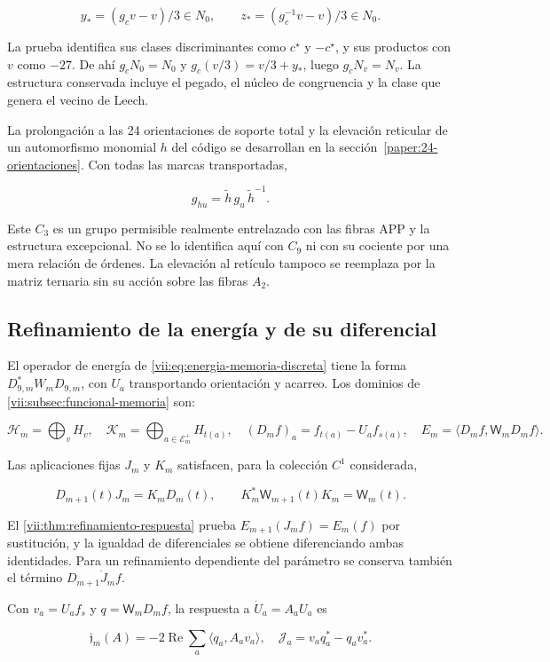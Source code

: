 \[
y_*=(g_cv-v)/3\in N_0,\qquad
z_*=(g_c^{-1}v-v)/3\in N_0.
\]

La prueba identifica sus clases discriminantes como \(c^\star\) y \(-c^\star\), y sus productos con \(v\) como \(-27\). De ahí \(g_cN_0=N_0\) y \(g_c(v/3)=v/3+y_*\), luego \(g_cN_v=N_v\). La estructura conservada incluye el pegado, el núcleo de congruencia y la clase que genera el vecino de Leech.

La prolongación a las 24 orientaciones de soporte total y la elevación reticular de un automorfismo monomial \(h\) del código se desarrollan en la sección~\ref{paper:24-orientaciones}. Con todas las marcas transportadas,

\[
g_{hu}=\widetilde h\,g_u\,\widetilde h^{-1}.
\]

Este \(C_3\) es un grupo permisible realmente entrelazado con las fibras APP y la estructura excepcional. No se lo identifica aquí con \(C_9\) ni con su cociente por una mera relación de órdenes. La elevación al retículo tampoco se reemplaza por la matriz ternaria sin su acción sobre las fibras \(A_2\).

\subsection{Refinamiento de la energía y de su diferencial}
\label{paper:refinamiento-energia}

El operador de energía de \eqref{vii:eq:energia-memoria-discreta} tiene la forma \(D_{9,m}^*W_mD_{9,m}\), con \(U_a\) transportando orientación y acarreo. Los dominios de \cref{vii:subsec:funcional-memoria} son:

\[
\mathcal H_m=\bigoplus_vH_v,\quad
\mathcal K_m=\bigoplus_{a\in\mathcal E_m^+}H_{t(a)},\quad
(D_mf)_a=f_{t(a)}-U_af_{s(a)},\quad
E_m=\langle D_mf,\mathsf W_mD_mf\rangle.
\]

Las aplicaciones fijas \(J_m\) y \(K_m\) satisfacen, para la colección \(C^1\) considerada,

\[
D_{m+1}(t)J_m=K_mD_m(t),\qquad
K_m^*\mathsf W_{m+1}(t)K_m=\mathsf W_m(t).
\]

El \cref{vii:thm:refinamiento-respuesta} prueba \(E_{m+1}(J_mf)=E_m(f)\) por sustitución, y la igualdad de diferenciales se obtiene diferenciando ambas identidades. Para un refinamiento dependiente del parámetro se conserva también el término \(D_{m+1}\dot J_mf\).

Con \(v_a=U_af_s\) y \(q=\mathsf W_mD_mf\), la respuesta a \(\dot U_a=A_aU_a\) es

\[
\mathfrak j_m(A)=-2\operatorname{Re}\sum_a\langle q_a,A_av_a\rangle,
\quad \mathcal J_a=v_aq_a^*-q_av_a^*.
\]


